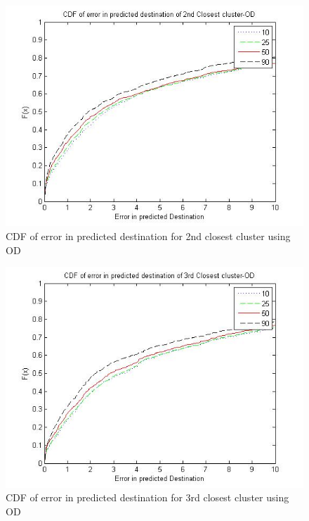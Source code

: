 \begin{figure}
\centering   
\includegraphics[scale=0.4]{figs/od_top2.jpg}
\caption{CDF of error in predicted destination for 2nd closest cluster using OD}
\label{fig:od_top2}  
\end{figure}

\begin{figure}
\centering   
\includegraphics[scale=0.4]{figs/od_top3.jpg}
\caption{CDF of error in predicted destination for 3rd closest cluster using OD}
\label{fig:od_top3}  
\end{figure}


